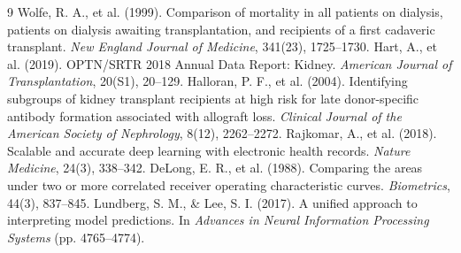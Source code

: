 \documentclass[11pt,a4paper]{article}
\begin{document}

\begin{thebibliography}{9}
 Wolfe, R. A., et al. (1999). Comparison of mortality in all patients on dialysis, patients on dialysis awaiting transplantation, and recipients of a first cadaveric transplant. \textit{New England Journal of Medicine}, 341(23), 1725--1730.
 Hart, A., et al. (2019). OPTN/SRTR 2018 Annual Data Report: Kidney. \textit{American Journal of Transplantation}, 20(S1), 20--129.
 Halloran, P. F., et al. (2004). Identifying subgroups of kidney transplant recipients at high risk for late donor-specific antibody formation associated with allograft loss. \textit{Clinical Journal of the American Society of Nephrology}, 8(12), 2262--2272.
 Rajkomar, A., et al. (2018). Scalable and accurate deep learning with electronic health records. \textit{Nature Medicine}, 24(3), 338--342.
 DeLong, E. R., et al. (1988). Comparing the areas under two or more correlated receiver operating characteristic curves. \textit{Biometrics}, 44(3), 837--845.
 Lundberg, S. M., \& Lee, S. I. (2017). A unified approach to interpreting model predictions. In \textit{Advances in Neural Information Processing Systems} (pp. 4765--4774).
\end{thebibliography}
\end{document}
